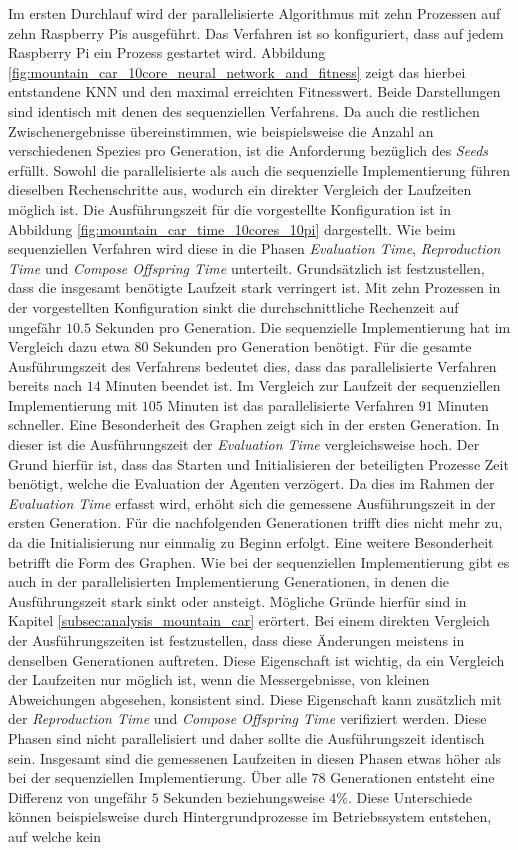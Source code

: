 Im ersten Durchlauf wird der parallelisierte Algorithmus mit zehn Prozessen auf zehn Raspberry Pis ausgeführt. Das Verfahren ist so konfiguriert, dass auf jedem Raspberry Pi ein Prozess gestartet wird. Abbildung \ref{fig:mountain_car_10core_neural_network_and_fitness} zeigt das hierbei entstandene \ac{KNN} und den maximal erreichten Fitnesswert. Beide Darstellungen sind identisch mit denen des sequenziellen Verfahrens. Da auch die restlichen Zwischenergebnisse übereinstimmen, wie beispielsweise die Anzahl an verschiedenen Spezies pro Generation, ist die Anforderung bezüglich des \emph{Seeds} erfüllt. Sowohl die parallelisierte als auch die sequenzielle Implementierung führen dieselben Rechenschritte aus, wodurch ein direkter Vergleich der Laufzeiten möglich ist. Die Ausführungszeit für die vorgestellte Konfiguration ist in Abbildung  \ref{fig:mountain_car_time_10cores_10pi} dargestellt. Wie beim sequenziellen Verfahren wird diese in die Phasen \emph{Evaluation Time}, \emph{Reproduction Time} und \emph{Compose Offspring Time} unterteilt. Grundsätzlich ist festzustellen, dass die insgesamt benötigte Laufzeit stark verringert ist. Mit zehn Prozessen in der vorgestellten Konfiguration sinkt die durchschnittliche Rechenzeit auf ungefähr $10.5$ Sekunden pro Generation. Die sequenzielle Implementierung hat im Vergleich dazu etwa $80$ Sekunden pro Generation benötigt. Für die gesamte Ausführungszeit des Verfahrens bedeutet dies, dass das parallelisierte Verfahren bereits nach $14$ Minuten beendet ist. Im Vergleich zur Laufzeit der sequenziellen Implementierung mit $105$ Minuten ist das parallelisierte Verfahren $91$ Minuten schneller. Eine Besonderheit des Graphen zeigt sich in der ersten Generation. In dieser ist die Ausführungszeit der \emph{Evaluation Time} vergleichsweise hoch. Der Grund hierfür ist, dass das Starten und Initialisieren der beteiligten Prozesse Zeit benötigt, welche die Evaluation der Agenten verzögert. Da dies im Rahmen der \emph{Evaluation Time} erfasst wird, erhöht sich die gemessene Ausführungszeit in der ersten Generation. Für die nachfolgenden Generationen trifft dies nicht mehr zu, da die Initialisierung nur einmalig zu Beginn erfolgt. Eine weitere Besonderheit betrifft die Form des Graphen. Wie bei der sequenziellen Implementierung gibt es auch in der parallelisierten Implementierung Generationen, in denen die Ausführungszeit stark sinkt oder ansteigt. Mögliche Gründe hierfür sind in Kapitel \ref{subsec:analysis_mountain_car} erörtert. Bei einem direkten Vergleich der Ausführungszeiten ist festzustellen, dass diese Änderungen meistens in denselben Generationen auftreten. Diese Eigenschaft ist wichtig, da ein Vergleich der Laufzeiten nur möglich ist, wenn die Messergebnisse, von kleinen Abweichungen abgesehen, konsistent sind. Diese Eigenschaft kann zusätzlich mit der \emph{Reproduction Time} und \emph{Compose Offspring Time} verifiziert werden. Diese Phasen sind nicht parallelisiert und daher sollte die Ausführungszeit identisch sein. Insgesamt sind die gemessenen Laufzeiten in diesen Phasen etwas höher als bei der sequenziellen Implementierung. Über alle $78$ Generationen entsteht eine Differenz von ungefähr $5$ Sekunden beziehungsweise $4\%$. Diese Unterschiede können beispielsweise durch Hintergrundprozesse im Betriebssystem entstehen, auf welche kein 